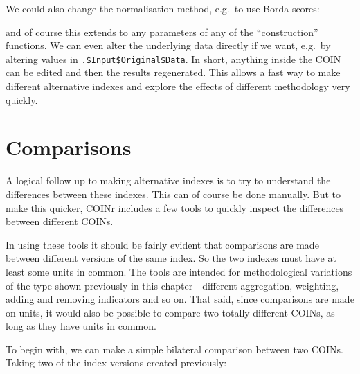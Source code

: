 \documentclass[
]{book}
\newenvironment{Shaded}{\begin{snugshade}}{\end{snugshade}}
\newcommand{\AttributeTok}[1]{\textcolor[rgb]{0.77,0.63,0.00}{#1}}
\newcommand{\CommentTok}[1]{\textcolor[rgb]{0.56,0.35,0.01}{\textit{#1}}}
\newcommand{\ConstantTok}[1]{\textcolor[rgb]{0.00,0.00,0.00}{#1}}
\newcommand{\FunctionTok}[1]{\textcolor[rgb]{0.00,0.00,0.00}{#1}}
\newcommand{\NormalTok}[1]{#1}
\newcommand{\OtherTok}[1]{\textcolor[rgb]{0.56,0.35,0.01}{#1}}
\newcommand{\SpecialCharTok}[1]{\textcolor[rgb]{0.00,0.00,0.00}{#1}}
\newcommand{\StringTok}[1]{\textcolor[rgb]{0.31,0.60,0.02}{#1}}
\begin{document}
We could also change the normalisation method, e.g.~to use Borda scores:

\begin{Shaded}
\end{Shaded}

and of course this extends to any parameters of any of the ``construction'' functions. We can even alter the underlying data directly if we want, e.g.~by altering values in \texttt{.\$Input\$Original\$Data}. In short, anything inside the COIN can be edited and then the results regenerated. This allows a fast way to make different alternative indexes and explore the effects of different methodology very quickly.

\hypertarget{comparisons}{%
\section{Comparisons}\label{comparisons}}

A logical follow up to making alternative indexes is to try to understand the differences between these indexes. This can of course be done manually. But to make this quicker, COINr includes a few tools to quickly inspect the differences between different COINs.

In using these tools it should be fairly evident that comparisons are made between different versions of the same index. So the two indexes must have at least some units in common. The tools are intended for methodological variations of the type shown previously in this chapter - different aggregation, weighting, adding and removing indicators and so on. That said, since comparisons are made on units, it would also be possible to compare two totally different COINs, as long as they have units in common.

To begin with, we can make a simple bilateral comparison between two COINs. Taking two of the index versions created previously:
\end{document}
